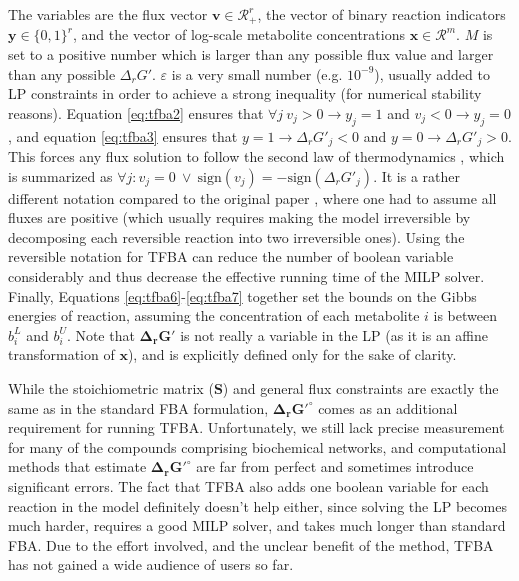 \documentclass[twocolumn]{article}
\begin{document}
The variables are the flux vector $\mathbf{v} \in \mathcal{R}_{+}^{r}$, the vector of binary reaction indicators $\mathbf{y} \in \{0,1\}^{r}$, and the vector of log-scale metabolite concentrations $\mathbf{x} \in \mathcal{R}^{m}$. $M$ is set to a positive number which is larger than any possible flux value and larger than any possible $\Delta_r G'$. $\varepsilon$ is a very small number (e.g. $10^{-9}$), usually added to LP constraints in order to achieve a strong inequality (for numerical stability reasons). Equation \ref{eq:tfba2} ensures that $\forall j~v_j > 0 \rightarrow y_j = 1$ and $v_j < 0 \rightarrow y_j = 0$, and equation \ref{eq:tfba3} ensures that $y = 1 \rightarrow \Delta_r G'_j < 0$ and $y = 0 \rightarrow \Delta_r G'_j > 0$. This forces any flux solution to follow the second law of thermodynamics \cite{Hoppe2007-sw, Machado2017-gh}, which is summarized as $\forall j:v_j = 0~\vee~\text{sign}(v_j) = -\text{sign}(\Delta_r G'_j)$. It is a rather different notation compared to the original paper \cite{Henry2007-xp}, where one had to assume all fluxes are positive (which usually requires making the model irreversible by decomposing each reversible reaction into two irreversible ones). Using the reversible notation for TFBA can reduce the number of boolean variable considerably and thus decrease the effective running time of the MILP solver.
Finally, Equations \ref{eq:tfba6}-\ref{eq:tfba7} together set the bounds on the Gibbs energies of reaction, assuming the concentration of each metabolite $i$ is between $b^L_i$ and $b^U_i$. Note that $\mathbf{\Delta_r G'}$ is not really a variable in the LP (as it is an affine transformation of $\mathbf{x}$), and is explicitly defined only for the sake of clarity. 

While the stoichiometric matrix ($\mathbf{S}$) and general flux constraints are exactly the same as in the standard FBA formulation, $\mathbf{\Delta_r G'^\circ}$ comes as an additional requirement for running TFBA. Unfortunately, we still lack precise measurement for many of the compounds comprising biochemical networks, and computational methods that estimate $\mathbf{\Delta_r G'^\circ}$ \cite{Jankowski2008-hd,Noor2012-mp,Noor2013-an,Jinich2014-nv} are far from perfect and sometimes introduce significant errors. The fact that TFBA also adds one boolean variable for each reaction in the model definitely doesn't help either, since solving the LP becomes much harder, requires a good MILP solver, and takes much longer than standard FBA. Due to the effort involved, and the unclear benefit of the method, TFBA has not gained a wide audience of users so far.
\end{document}
